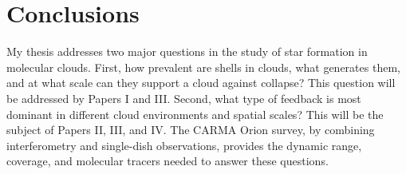 \section{Conclusions}\label{sec:conclusions}
My thesis addresses two major questions in the study of star formation in molecular clouds. First, how prevalent are shells in clouds, what generates them, and at what scale can they support a cloud against collapse? This question will be addressed by Papers I and III. Second, what type of feedback is most dominant in different cloud environments and spatial scales? This will be the subject of Papers II, III, and IV. The CARMA Orion survey, by combining interferometry and single-dish observations, provides the dynamic range, coverage, and molecular tracers needed to answer these questions.